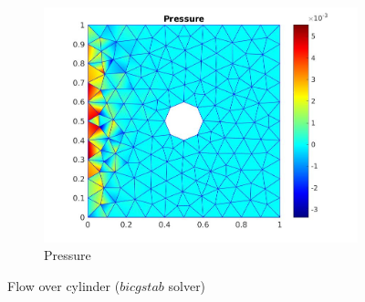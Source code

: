 \documentclass[a4paper,openany]{book}
\begin{document}
\begin{figure}
\begin{subfigure}{\textwidth}
    \includegraphics[width=0.8\linewidth]{cylinder_bicgstab_pressure.jpg}
    \caption{Pressure}
      \label{pressure_stoke_bicgstab}
\end{subfigure}
\caption{Flow over cylinder ($bicgstab$ solver)}
\label{flow_over_cylinder_bicgstab}
\end{figure}
\end{document}
